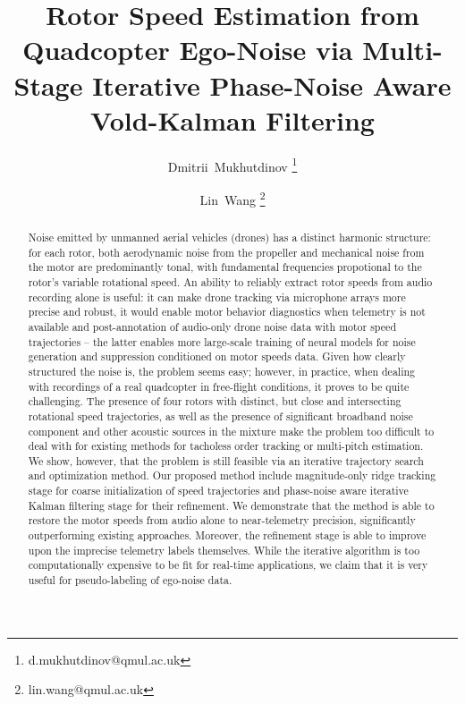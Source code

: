 \documentclass[journal]{IEEEtran}
\begin{document}
\title{Rotor Speed Estimation from Quadcopter Ego-Noise via Multi-Stage Iterative Phase-Noise Aware Vold-Kalman Filtering}

\author[1]{Dmitrii~Mukhutdinov \thanks{d.mukhutdinov@qmul.ac.uk}}
\author[1]{Lin~Wang \thanks{lin.wang@qmul.ac.uk}}


\maketitle

\begin{abstract}
Noise emitted by unmanned aerial vehicles (drones) has a distinct harmonic
structure: for each rotor, both aerodynamic noise from the propeller and mechanical
noise from the motor are predominantly tonal, with fundamental frequencies propotional to
the rotor's variable rotational speed. An ability to reliably extract rotor speeds from
audio recording alone is useful: it can make drone tracking via microphone arrays more precise
and robust, it would enable motor behavior diagnostics when telemetry is not available and
post-annotation of audio-only drone noise data with motor speed trajectories -- the latter
enables more large-scale training of neural models for noise generation and suppression
conditioned on motor speeds data. Given how clearly structured the noise is, the problem
seems easy; however, in practice, when dealing with recordings
of a real quadcopter in free-flight conditions, it proves to be quite challenging.
The presence of four rotors with distinct, but close and intersecting rotational speed
trajectories, as well as the presence of significant broadband noise component and other
acoustic sources in the mixture make the problem too difficult to deal with for existing
methods for tacholess order tracking or multi-pitch estimation.
We show, however, that the problem is still feasible via an iterative trajectory search
and optimization method. Our proposed method include magnitude-only ridge tracking stage
for coarse initialization of speed trajectories and phase-noise aware iterative Kalman
filtering stage for their refinement. We demonstrate that the method is able to restore
the motor speeds from audio alone to near-telemetry precision, significantly outperforming
existing approaches. Moreover, the refinement stage is able to improve upon the imprecise
telemetry labels themselves. While the iterative algorithm is too computationally expensive to
be fit for real-time applications, we claim that it is very useful for pseudo-labeling
of ego-noise data.
\end{abstract}
\end{document}
